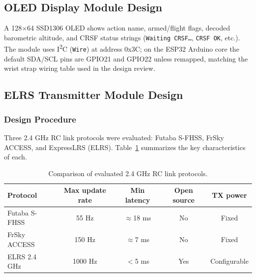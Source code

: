 \subsection{OLED Display Module Design}

A 128$\times$64 SSD1306 OLED shows action name, armed/flight flags, decoded barometric altitude,
and CRSF status strings (\texttt{Waiting CRSF\ldots}, \texttt{CRSF OK}, etc.).
The module uses I\textsuperscript{2}C (\texttt{Wire}) at address 0x3C; on the ESP32 Arduino core the default
SDA/SCL pins are GPIO21 and GPIO22 unless remapped, matching the wrist strap wiring table used in
the design review.

\subsection{ELRS Transmitter Module Design}
\label{subsec:elrs}

\subsubsection{Design Procedure}

Three 2.4 GHz RC link protocols were evaluated: Futaba S-FHSS, FrSky ACCESS, and
ExpressLRS (ELRS).
Table~\ref{tab:rf-comparison} summarizes the key characteristics of each.

\begin{table}[htb!]
    \centering
    \caption{Comparison of evaluated 2.4 GHz RC link protocols.}
    \label{tab:rf-comparison}
    \begin{tabularx}{\linewidth}{l c c c c}
        \hline
        \textbf{Protocol} & \textbf{Max update rate} & \textbf{Min latency} &
            \textbf{Open source} & \textbf{TX power} \\
        \hline
        Futaba S-FHSS  & 55 Hz    & $\approx$18 ms & No  & Fixed      \\
        FrSky ACCESS   & 150 Hz   & $\approx$7 ms  & No  & Fixed      \\
        ELRS 2.4 GHz   & 1000 Hz  & $<$5 ms        & Yes & Configurable \\
        \hline
    \end{tabularx}
\end{table}

